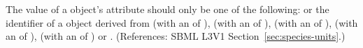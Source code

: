 The value of a \Species object's  attribute should
only be one of the following:  or the
identifier of a \UnitDefinition object derived from  (with an
 of ),  (with an  of
),  (with an  of ), 
(with an  of ),  (with an
 of ) or .  (References: SBML
L3V1 Section~\ref{sec:species-units}.)
